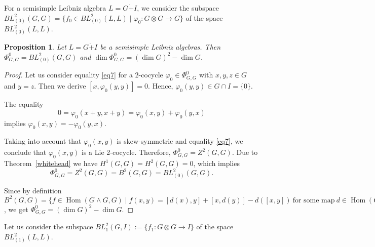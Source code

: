 \documentclass[12pt,reqno]{amsart}
\newtheorem{prop}[thm]{Proposition}
\numberwithin{equation}{section}
\begin{document}
For a semisimple Leibniz algebra $L=G\dot{+}I$, we consider the subspace $BL_{(0)}^2(G,G)=\{f_0\in BL_{(0)}^2(L,L) \mid \varphi_0 \colon G\otimes G \rightarrow G \}$
 of the space $BL_{(0)}^2(L,L)$.

\begin{prop}  Let $L=G\dot{+}I$ be a semisimple Leibniz algebras. Then $\Phi_{G,G}^{0}=BL_{(0)}^2(G,G)$ and $\dim \Phi_{G,G}^{0}=(\dim G)^2 - \dim G$.
\end{prop}
\begin{proof} Let us consider equality \eqref{eq7} for a $2$-cocycle $\varphi_0\in \Phi_{G,G}^{0}$ with $x, y, z\in G$ and $y=z$.
 Then we derive $[x,\varphi_0(y,y)]=0$. Hence, $\varphi_0(y,y)\in G\cap I=\{0\}$.

The equality
\[ 0=\varphi_0(x+y,x+y)=\varphi_0(x,y)+\varphi_0(y,x) \]
implies $\varphi_0(x,y)=-\varphi_0(y,x)$.

Taking into account that $\varphi_0(x,y)$ is skew-symmetric and equality \eqref{eq7}, we conclude that $\varphi_0(x,y)$
is a Lie 2-cocycle. Therefore, $\Phi_{G,G}^{0}=Z^2(G,G)$.
Due to Theorem~\ref{whitehead} we have $H^1(G,G)=H^2(G,G)=0$, which implies \[\Phi_{G,G}^{0}=Z^2(G,G)=B^2(G,G)=BL_{(0)}^2(G,G).\]

Since by definition $B^2(G,G)=\{f \in \operatorname{Hom}(G \wedge G,G) \mid f(x,y) = [d(x),y] + [x,d(y)] -
d([x,y]) \ \text{for some map} \ d\in \operatorname{Hom}(G, G)\setminus \operatorname{Der}(G)\}$, we get
$\Phi_{G,G}^{0}=(\dim G)^2 - \dim G$.
\end{proof}

Let us consider the subspace $BL_{1}^2(G,I):=\{f_1 \colon  G\otimes G \rightarrow I\}$ of the space $BL_{(1)}^2(L,L)$.
\end{document}
